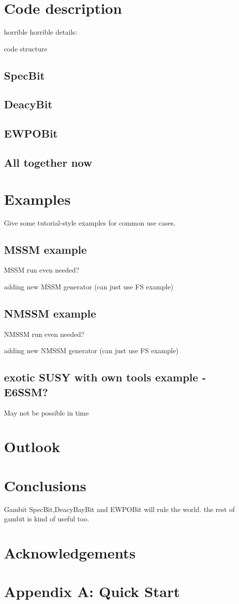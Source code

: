 \documentclass[11pt,a4paper]{article}
\begin{document}
\section{Code description}

horrible horrible details:

code structure

\subsection{SpecBit}
\subsection{DeacyBit}
\subsection{EWPOBit}
\subsection{All together now}



\section{Examples}
Give some tutorial-style examples for common use cases.

\subsection{MSSM example}
MSSM run even needed?

adding new MSSM generator (can just use FS example)
\subsection{NMSSM example}
NMSSM run even needed?

adding new NMSSM generator (can just use FS example)
\subsection{exotic SUSY with own tools example - E6SSM?}
May not be possible in time

\section{Outlook}

\section{Conclusions}
Gambit SpecBit,DeacyBayBit and EWPOBit will rule the world.  the rest of gambit is kind of useful too.
\section{Acknowledgements}

\section{Appendix A: Quick Start}
\end{document}
